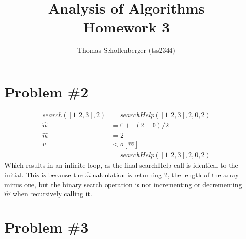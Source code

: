 \documentclass{article}
\title{%
  Analysis of Algorithms \\
  \large Homework 3 }
\author{Thomas Schollenberger (tss2344)}
\begin{document}
    \maketitle
    \section*{Problem \#2}
    \begin{subequations}
        \begin{align}
            search([1,2,3], 2) &= searchHelp([1,2,3], 2, 0, 2) \\
            \hat{m} &= 0 + \lfloor(2-0)/2\rfloor \\
            \hat{m} &= 2 \\
            v &< a[\hat{m}] \\
            &= searchHelp([1,2,3], 2, 0, 2)
        \end{align}
    \end{subequations}
    Which results in an infinite loop, as the final searchHelp call is identical to the initial.
    This is because the \(\hat{m}\) calculation is returning 2, the length of the array minus one, 
    but the binary search operation is not incrementing or decrementing \(\hat{m}\) when recursively calling it.

    \section*{Problem \#3}
\end{document}
